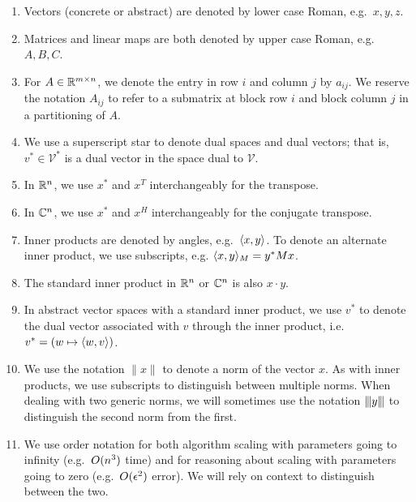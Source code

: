 \documentclass[12pt, leqno]{article} %
\begin{document}
\begin{enumerate}
\item
  Vectors (concrete or abstract) are denoted by lower case Roman,
  e.g.~$x, y, z$.

\item
  Matrices and linear maps are both denoted by upper case Roman,
  e.g.~$A, B, C$.

\item
  For $A \in \mathbb{R}^{m \times n}$, we denote the entry in row $i$ and
  column $j$ by $a_{ij}$.  We reserve the notation $A_{ij}$ to refer to
  a submatrix at block row $i$ and block column $j$ in a partitioning of
  $A$.

\item
  We use a superscript star to denote dual spaces and dual vectors; that
  is, $v^* \in \mathcal{V}^*$ is a dual vector in the space dual to
  $\mathcal{V}$.

\item
  In $\mathbb{R}^n$, we use $x^*$ and $x^T$ interchangeably for the transpose.

\item
  In $\mathbb{C}^n$, we use $x^*$ and $x^H$ interchangeably for the conjugate
  transpose.

\item
  Inner products are denoted by angles, e.g.~$\langle x, y \rangle$. To denote an
  alternate inner product, we use subscripts, e.g. $\langle x, y \rangle_M = y^* M
  x$.

\item
  The standard inner product in $\mathbb{R}^n$ or $\mathbb{C}^n$ is also $x \cdot y$.

\item
  In abstract vector spaces with a standard inner product, we use $v^*$
  to denote the dual vector associated with $v$ through the inner
  product, i.e.~$v^* = (w \mapsto \langle w, v \rangle)$.

\item
  We use the notation $\|x\|$ to denote a norm of the vector $x$. As
  with inner products, we use subscripts to distinguish between multiple
  norms.  When dealing with two generic norms, we will sometimes use the
  notation ${\left\vert\kern-0.25ex\left\vert\kern-0.25ex\left\vert y \right\vert\kern-0.25ex\right\vert\kern-0.25ex\right\vert}$ to distinguish the second norm from the first.

\item
  We use order notation for both algorithm scaling with parameters going
  to infinity (e.g.~$O( n^3 )$ time) and for reasoning about scaling
  with parameters going to zero (e.g.~$O( \epsilon^2 )$ error). We
  will rely on context to distinguish between the two.


\end{enumerate}
\end{document}
